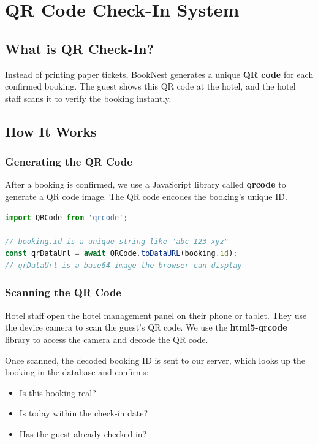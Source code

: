 \documentclass[12pt,a4paper]{article}
\begin{document}
\newpage
\section{QR Code Check-In System}

\subsection{What is QR Check-In?}
Instead of printing paper tickets, BookNest generates a unique \textbf{QR code} for each confirmed booking. The guest shows this QR code at the hotel, and the hotel staff scans it to verify the booking instantly.

\subsection{How It Works}

\subsubsection{Generating the QR Code}
After a booking is confirmed, we use a JavaScript library called \textbf{qrcode} to generate a QR code image. The QR code encodes the booking's unique ID.

\begin{lstlisting}[language=JavaScript, caption=Generating a QR Code]
import QRCode from 'qrcode';

// booking.id is a unique string like "abc-123-xyz"
const qrDataUrl = await QRCode.toDataURL(booking.id);
// qrDataUrl is a base64 image the browser can display
\end{lstlisting}

\subsubsection{Scanning the QR Code}
Hotel staff open the hotel management panel on their phone or tablet. They use the device camera to scan the guest's QR code. We use the \textbf{html5-qrcode} library to access the camera and decode the QR code.

Once scanned, the decoded booking ID is sent to our server, which looks up the booking in the database and confirms:
\begin{itemize}
  \item Is this booking real?
  \item Is today within the check-in date?
  \item Has the guest already checked in?
\end{itemize}
\end{document}

